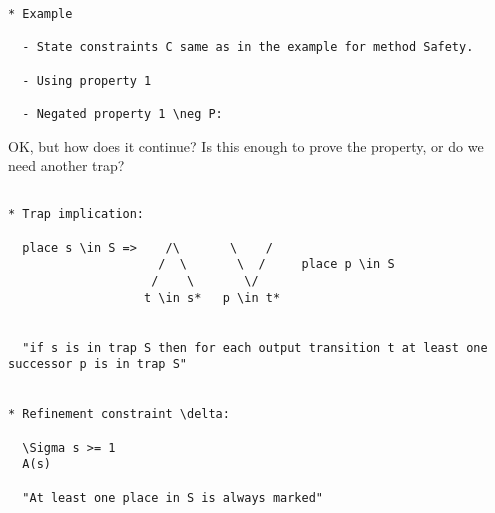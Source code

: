 \newpage

\begin{verbatim}
* Example

  - State constraints C same as in the example for method Safety.
  
  - Using property 1
  
  - Negated property 1 \neg P:
\end{verbatim}


{\Large OK, but how does it continue? Is this enough to prove the property,
or do we need another trap?}

\iffalse
\begin{verbatim}
    p2 + q2 + q3 + nbit1 + nbit2 >= 1
    ^    ^    ^    ^       ^
    |    |    |    |       |
    ------------------------
      |
      S = {p2, q2, q3, nbit1, nbit2}, therefore \delta excludes
      assignment A in the next iteration
\end{verbatim}
\fi

\newpage

\begin{verbatim}

* Trap implication:

  place s \in S =>    /\       \    /
                     /  \       \  /     place p \in S
                    /    \       \/
                   t \in s*   p \in t*   


  "if s is in trap S then for each output transition t at least one successor p is in trap S"


* Refinement constraint \delta:

  \Sigma s >= 1  
  A(s)

  "At least one place in S is always marked"
\end{verbatim}

\fi


